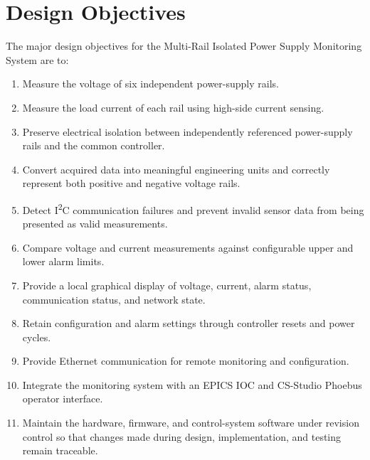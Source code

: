 \section{Design Objectives}

The major design objectives for the Multi-Rail Isolated Power Supply Monitoring
System are to:

\begin{enumerate}
    \item Measure the voltage of six independent power-supply rails.

    \item Measure the load current of each rail using high-side current sensing.

    \item Preserve electrical isolation between independently referenced
    power-supply rails and the common controller.

    \item Convert acquired data into meaningful engineering units and correctly
    represent both positive and negative voltage rails.

    \item Detect I\textsuperscript{2}C communication failures and prevent invalid
    sensor data from being presented as valid measurements.

    \item Compare voltage and current measurements against configurable upper and
    lower alarm limits.

    \item Provide a local graphical display of voltage, current, alarm status,
    communication status, and network state.

    \item Retain configuration and alarm settings through controller resets and
    power cycles.

    \item Provide Ethernet communication for remote monitoring and configuration.

    \item Integrate the monitoring system with an EPICS IOC and CS-Studio Phoebus
    operator interface.

    \item Maintain the hardware, firmware, and control-system software under
    revision control so that changes made during design, implementation, and
    testing remain traceable.
\end{enumerate}


